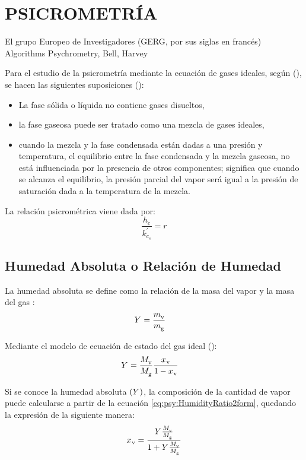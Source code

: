 \section{PSICROMETRÍA}

  El grupo Europeo de Investigadores (GERG, por sus siglas en francés)  Algorithms Psychrometry, Bell, Harvey

Para el estudio de la psicrometría mediante la ecuación de gases ideales, según (), se hacen las siguientes suposiciones ():

\begin{itemize}
  \item La fase sólida o líquida no contiene gases disueltos,
  \item la fase gaseosa puede ser tratado como una mezcla de gases ideales,
  \item cuando la mezcla y la fase condensada están dadas a una presión y temperatura, el equilibrio entre la fase condensada y la mezcla gaseosa, no está influenciada por la presencia de otros componentes; significa que cuando se alcanza el equilibrio, la presión parcial del vapor ser\'a igual a la presión de saturaci\'on dada a la temperatura de la mezcla.
\end{itemize}

La relación psicrométrica viene dada por:
\begin{equation}
  \frac{h_{c}}{k_{c_s}^{'}} = r
\end{equation}

\eqVanDerWaals

\subsection{Humedad Absoluta o Relación de Humedad}
  La humedad absoluta se define como la relación de la masa del vapor \performVapor{} y la masa del gas \performGas{}:
  \begin{align}
    Y_{{}}^{} &= \frac{{m_{{\text{\ensuremath{\text{v}}}}}^{}}}{{m_{{\text{\ensuremath{\text{g}}}}}^{}}}
  \end{align}

  Mediante el modelo de ecuación de estado del gas ideal (\eqIdealGasEosForMass{}):
\begin{align}
  \label{eq:psy:HumidityRatio2form}
  Y_{{}}^{} &= \frac{M_{{\text{\ensuremath{\text{v}}}}}^{}}{M_{{\text{\ensuremath{\text{g}}}}}^{}} \frac{{x_{}}_{{\text{\ensuremath{\text{v}}}}}}{1-{{x_{}}_{{\text{\ensuremath{\text{v}}}}}}}
\end{align}

Si se conoce la humedad absoluta $\left(Y_{{}}^{} \right)$, la composición de la cantidad de vapor puede calcularse a partir de la ecuación \eqref{eq:psy:HumidityRatio2form}, quedando la expresión de la siguiente manera:
\begin{equation}
  {x_{}}_{{\text{\ensuremath{\text{v}}}}} = \frac{Y_{{}}^{} \frac{M_{{\text{\ensuremath{\text{v}}}}}^{}}{M_{{\text{\ensuremath{\text{g}}}}}^{}}}{1 + Y_{{}}^{} \frac{M_{{\text{\ensuremath{\text{v}}}}}^{}}{M_{{\text{\ensuremath{\text{g}}}}}^{}}}
\end{equation}

